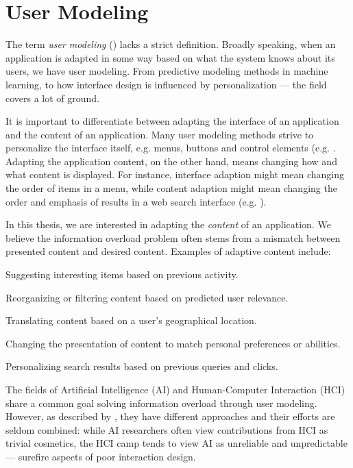 \section{User Modeling}
\label{sec:modeling}

The term \emph{user modeling} () lacks a strict definition. 
Broadly speaking, when an application is adapted in some way based on what the system knows about its users, we have user modeling. 
From predictive modeling methods in machine learning, 
to how interface design is influenced by personalization --- the field covers a lot of ground. 

It is important to differentiate between adapting the interface of an application and the content of an application. 
Many user modeling methods strive to personalize the interface itself, e.g. menus, buttons and control elements 
(e.g. \cite{Jameson2009, Fischer2001}. 
Adapting the application content, on the other hand, means changing how and what content is displayed.
For instance, interface adaption might mean changing the order of items in a menu, while content 
adaption might mean changing the order and emphasis of results in a web search interface
(e.g. \cite{Xu2008, Qiu2006, Rhodes2000}).

In this thesis, we are interested in adapting the \emph{content} of an application.
We believe the information overload problem often stems from a mismatch between presented content and desired content. 
Examples of adaptive content include:

\begin{itemize*}
  \item Suggesting interesting items based on previous activity.
  \item Reorganizing or filtering content based on predicted user relevance.
  \item Translating content based on a user's geographical location.
  \item Changing the presentation of content to match personal preferences or abilities.
  \item Personalizing search results based on previous queries and clicks.
\end{itemize*}

The fields of Artificial Intelligence (AI) and Human-Computer Interaction (HCI) share a common goal solving information overload through user modeling. 
However, as described by \cite[p6]{Lieberman2009}, they have different approaches and their efforts are seldom combined: 
while AI researchers often view contributions from HCI as trivial cosmetics, the HCI camp
tends to view AI as unreliable and unpredictable --- surefire aspects of poor interaction design.

